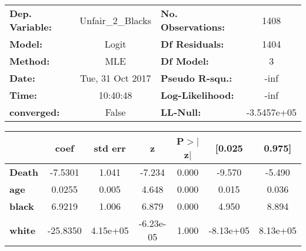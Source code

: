 \documentclass{report}
\begin{document}
\begin{center}
\begin{tabular}{lclc}
\toprule
\textbf{Dep. Variable:} & Unfair_2_Blacks  & \textbf{  No. Observations:  } &      1408    \\
\textbf{Model:}         &      Logit       & \textbf{  Df Residuals:      } &      1404    \\
\textbf{Method:}        &       MLE        & \textbf{  Df Model:          } &         3    \\
\textbf{Date:}          & Tue, 31 Oct 2017 & \textbf{  Pseudo R-squ.:     } &      -inf    \\
\textbf{Time:}          &     10:40:48     & \textbf{  Log-Likelihood:    } &       -inf   \\
\textbf{converged:}     &      False       & \textbf{  LL-Null:           } & -3.5457e+05  \\
\bottomrule
\end{tabular}
\begin{tabular}{lcccccc}
               & \textbf{coef} & \textbf{std err} & \textbf{z} & \textbf{P$>$$|$z$|$} & \textbf{[0.025} & \textbf{0.975]}  \\
\midrule
\textbf{Death} &      -7.5301  &        1.041     &    -7.234  &         0.000        &       -9.570    &       -5.490     \\
\textbf{age}   &       0.0255  &        0.005     &     4.648  &         0.000        &        0.015    &        0.036     \\
\textbf{black} &       6.9219  &        1.006     &     6.879  &         0.000        &        4.950    &        8.894     \\
\textbf{white} &     -25.8350  &     4.15e+05     & -6.23e-05  &         1.000        &    -8.13e+05    &     8.13e+05     \\
\bottomrule
\end{tabular}
\end{center}
\end{document}
